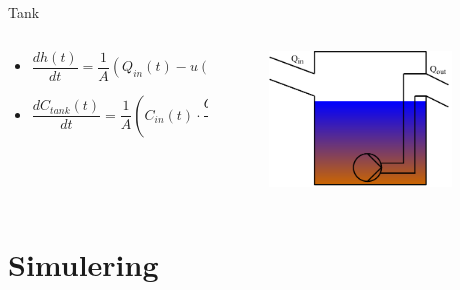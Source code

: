 \begin{frame}{Tank}{}
\vfill\vfill\centering
	\begin{columns}
	\begin{column}{0.75\textwidth}
		\begin{itemize}
			\vspace{9mm}
			\item<1-> $\dfrac{dh(t)}{dt}=\dfrac{1}{A} \left(Q_{in}(t)-u(t) \cdot \overline Q \right)$
			\vspace{9mm}
			\item<2-> $\dfrac{dC_{tank}(t)}{dt} = \dfrac{1}{A} \left(C_{in}(t) \cdot \dfrac{Q_{in}(t)}{h(t)} - C_{tank}(t) \cdot \dfrac{Q_{out}(t)}{h(t)} \right)$
		\end{itemize}
	\end{column}

	\begin{column}{0.3\textwidth}
		\begin{figure}[H]
			\centering
			\includegraphics[width=0.9\textwidth]{Sections/pictures/reservior_with_pump.pdf}
		\end{figure}
	\end{column}
\end{columns}
\vfill\vfill		
\end{frame}
	
\section{Simulering}

